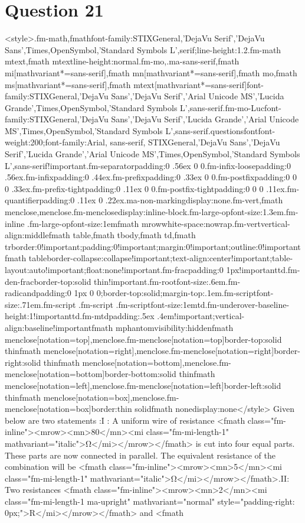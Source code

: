 \documentclass{article}
\begin{document}
\section*{Question 21}
<style>.fm-math,fmath{font-family:STIXGeneral,'DejaVu Serif','DejaVu Sans',Times,OpenSymbol,'Standard Symbols L',serif;line-height:1.2}.fm-math mtext,fmath mtext{line-height:normal}.fm-mo,.ma-sans-serif,fmath mi[mathvariant*=sans-serif],fmath mn[mathvariant*=sans-serif],fmath mo,fmath ms[mathvariant*=sans-serif],fmath mtext[mathvariant*=sans-serif]{font-family:STIXGeneral,'DejaVu Sans','DejaVu Serif','Arial Unicode MS','Lucida Grande',Times,OpenSymbol,'Standard Symbols L',sans-serif}.fm-mo-Luc{font-family:STIXGeneral,'DejaVu Sans','DejaVu Serif','Lucida Grande','Arial Unicode MS',Times,OpenSymbol,'Standard Symbols L',sans-serif}.questionsfont{font-weight:200;font-family:Arial, sans-serif, STIXGeneral,'DejaVu Sans','DejaVu Serif','Lucida Grande','Arial Unicode MS',Times,OpenSymbol,'Standard Symbols L',sans-serif!important}.fm-separator{padding:0 .56ex 0 0}.fm-infix-loose{padding:0 .56ex}.fm-infix{padding:0 .44ex}.fm-prefix{padding:0 .33ex 0 0}.fm-postfix{padding:0 0 0 .33ex}.fm-prefix-tight{padding:0 .11ex 0 0}.fm-postfix-tight{padding:0 0 0 .11ex}.fm-quantifier{padding:0 .11ex 0 .22ex}.ma-non-marking{display:none}.fm-vert,fmath menclose,menclose.fm-menclose{display:inline-block}.fm-large-op{font-size:1.3em}.fm-inline .fm-large-op{font-size:1em}fmath mrow{white-space:nowrap}.fm-vert{vertical-align:middle}fmath table,fmath tbody,fmath td,fmath tr{border:0!important;padding:0!important;margin:0!important;outline:0!important}fmath table{border-collapse:collapse!important;text-align:center!important;table-layout:auto!important;float:none!important}.fm-frac{padding:0 1px!important}td.fm-den-frac{border-top:solid thin!important}.fm-root{font-size:.6em}.fm-radicand{padding:0 1px 0 0;border-top:solid;margin-top:.1em}.fm-script{font-size:.71em}.fm-script .fm-script .fm-script{font-size:1em}td.fm-underover-base{line-height:1!important}td.fm-mtd{padding:.5ex .4em!important;vertical-align:baseline!important}fmath mphantom{visibility:hidden}fmath menclose[notation=top],menclose.fm-menclose[notation=top]{border-top:solid thin}fmath menclose[notation=right],menclose.fm-menclose[notation=right]{border-right:solid thin}fmath menclose[notation=bottom],menclose.fm-menclose[notation=bottom]{border-bottom:solid thin}fmath menclose[notation=left],menclose.fm-menclose[notation=left]{border-left:solid thin}fmath menclose[notation=box],menclose.fm-menclose[notation=box]{border:thin solid}fmath none{display:none}</style> Given below are two statements :\newlineStatement I : A uniform wire of resistance <fmath class="fm-inline"><mrow><mn>80</mn><mi class="fm-mi-length-1" mathvariant="italic">Ω</mi></mrow></fmath> is cut into four equal parts. These parts are now connected in parallel. The equivalent resistance of the combination will be <fmath class="fm-inline"><mrow><mn>5</mn><mi class="fm-mi-length-1" mathvariant="italic">Ω</mi></mrow></fmath>.\newlineStatement II: Two resistances <fmath class="fm-inline"><mrow><mn>2</mn><mi class="fm-mi-length-1 ma-upright" mathvariant="normal" style="padding-right: 0px;">R</mi></mrow></fmath> and <fmath 
\end{document}
